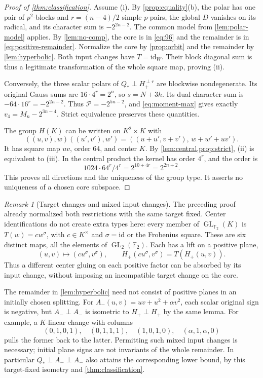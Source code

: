 \documentclass[11pt,a4paper]{article}
\theoremstyle{definition}
\theoremstyle{remark}
\newtheorem{remark}[theorem]{Remark}
\numberwithin{equation}{section}
\newcommand{\F}{\mathbb F}
\newcommand{\GL}{\operatorname{GL}}
\newcommand{\Pm}{\mathcal P}
\newcommand{\vfour}{v_4}
\newcommand{\Qstar}{Q_*}
\newcommand{\Hp}{H_+}
\newcommand{\id}{\mathrm{id}}
\begin{document}
\begin{proof}[Proof of \cref{thm:classification}]
Assume (i). By \cref{prop:equality}(b), the polar has one pair of
\(p^2\)-blocks and \(r=(n-4)/2\) simple \(p\)-pairs, the global
\(D\) vanishes on its radical, and its character sum is
\(-2^{2n-2}\).
The common model from \cref{lem:polar-model} applies.
By \cref{lem:no-comp}, the core is in \eqref{eq:96} and the remainder
is in \eqref{eq:positive-remainder}.
Normalize the core by \cref{prop:orbit} and the remainder by
\cref{lem:hyperbolic}. Both input changes have \(T=\id_W\).
Their block diagonal sum is thus a legitimate transformation of the
whole square map, proving (ii).

Conversely, the three scalar polars of
\(\Qstar\perp\Hp^{\perp r}\) are blockwise nondegenerate.
Its original Gauss sums are \(16\cdot4^r=2^n\), so \(s=N+3h\).
Its dual character sum is
\(-64\cdot16^r=-2^{2n-2}\).
Thus \(\Pm=-2^{5n-2}\), and \eqref{eq:moment-max} gives exactly
\(\vfour=M_n-2^{3n-4}\). Strict equivalence preserves these quantities.

The group \(H(K)\) can be written on \(K^2\times K\) with
\[
 ((u,v),w)((u',v'),w')=
 ((u+u',v+v'),\,w+w'+uv').
\]
It has square map \(uv\), order \(64\), and center \(K\).
By \cref{lem:central,prop:strict}, (ii) is equivalent to (iii).
In the central product the kernel has order \(4^r\), and the order is
\[
 1024\cdot64^r/4^r=2^{10+4r}=2^{2n+2}.
\]
This proves all directions and the uniqueness of the group type.
It asserts no uniqueness of a chosen core subspace.
\end{proof}

\begin{remark}[Target changes and mixed input changes]\label{rem:target}
The preceding proof already normalized both restrictions with the same
target fixed. Center identifications do not create extra types here:
every member of \(\GL_{\F_2}(K)\) is \(T(w)=c w^\sigma\), with
\(c\in K^\times\) and \(\sigma=\id\) or the Frobenius square.
These are six distinct maps, all the elements of \(\GL_2(\F_2)\).
Each has a lift on a positive plane,
\[
 (u,v)\longmapsto(cu^\sigma,v^\sigma),\qquad
 \Hp(cu^\sigma,v^\sigma)=T(\Hp(u,v)).
\]
Thus a different center gluing on each positive factor can be absorbed
by its input change, without imposing an incompatible target change
on the core.

The remainder in \cref{lem:hyperbolic} need not consist of positive
planes in an initially chosen splitting.
For \(A_-(u,v)=uv+u^2+\alpha v^2\), each scalar original sign is
negative, but \(A_-\perp A_-\) is isometric to
\(\Hp\perp\Hp\) by the same lemma.
For example, a \(K\)-linear change with columns
\[
 (0,1,0,1),\quad(0,1,1,1),\quad(1,0,1,0),\quad(\alpha,1,\alpha,0)
\]
pulls the former back to the latter. Permitting such mixed input
changes is necessary; initial plane signs are not invariants of
the whole remainder. In particular \(\Qstar\perp A_-\perp A_-\)
also attains the corresponding lower bound, by this target-fixed
isometry and \cref{thm:classification}.
\end{remark}
\end{document}

